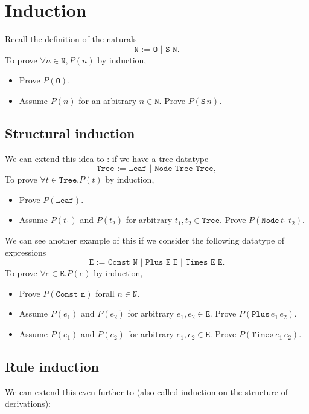 \documentclass[class=scrartcl]{standalone}
\begin{document}
\section{Induction}
Recall the definition of the naturals
\[
  \texttt{N := O | S N}.
\]
To prove \(\forall n \in \texttt{N}, P(n)\) by induction,
\begin{itemize}[nosep]
  \item Prove \(P(\texttt{O})\).
  \item Assume \(P(n)\) for an arbitrary \(n \in \texttt{N}\).
        Prove \(P(\texttt{S}\, n)\).
\end{itemize}

\subsection{Structural induction}
We can extend this idea to :
if we have a tree datatype
\[
  \texttt{Tree := Leaf | Node Tree Tree},
\]
To prove \(\forall t \in \texttt{Tree}. P(t)\) by induction,
\begin{itemize}[nosep]
  \item Prove \(P(\texttt{Leaf})\).
  \item Assume \(P(t_1)\) and \(P(t_2)\)
        for arbitrary \(t_1, t_2 \in \texttt{Tree}\).
        Prove \(P(\texttt{Node}\, t_1\, t_2)\).
\end{itemize}

We can see another example of this if we consider the
following datatype of expressions
\[
  \texttt{E := Const N | Plus E E | Times E E}.
\]
To prove \(\forall e \in \texttt{E}. P(e)\) by induction,
\begin{itemize}[nosep]
  \item Prove \(P(\texttt{Const n})\) forall \(n \in \texttt{N}\).
  \item Assume \(P(e_1)\) and \(P(e_2)\)
        for arbitrary \(e_1, e_2 \in \texttt{E}\).
        Prove \(P(\texttt{Plus}\, e_1\, e_2)\).
  \item Assume \(P(e_1)\) and \(P(e_2)\)
        for arbitrary \(e_1, e_2 \in \texttt{E}\).
        Prove \(P(\texttt{Times}\, e_1\, e_2)\).
\end{itemize}


\subsection{Rule induction}
We can extend this even further to 
(also called induction on the structure of derivations):
\end{document}
